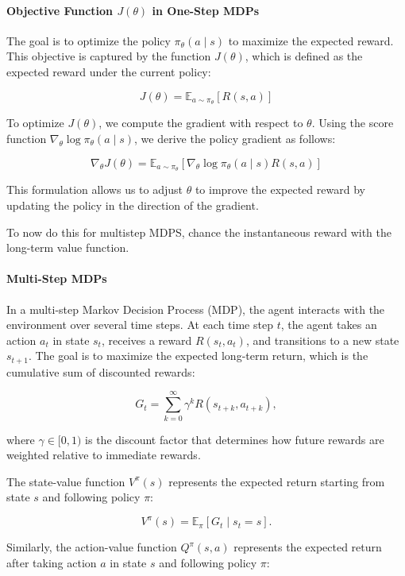 \documentclass[10pt, oneside]{article}
\theoremstyle{definition}
\begin{document}
\paragraph{Objective Function \( J(\theta) \) in One-Step MDPs}

The goal is to optimize the policy \( \pi_\theta(a \mid s) \) to maximize the expected reward. This objective is captured by the function \( J(\theta) \), which is defined as the expected reward under the current policy:

\[
J(\theta) = \mathbb{E}_{a \sim \pi_\theta} [R(s, a)]
\]

To optimize \( J(\theta) \), we compute the gradient with respect to \( \theta \). Using the score function \( \nabla_\theta \log \pi_\theta(a \mid s) \), we derive the policy gradient as follows:

\[
\nabla_\theta J(\theta) = \mathbb{E}_{a \sim \pi_\theta} \left[ \nabla_\theta \log \pi_\theta(a \mid s) R(s, a) \right]
\]

This formulation allows us to adjust \( \theta \) to improve the expected reward by updating the policy in the direction of the gradient.

To now do this for multistep MDPS, chance the instantaneous reward with the long-term value function. 

\paragraph{Multi-Step MDPs}

In a multi-step Markov Decision Process (MDP), the agent interacts with the environment over several time steps. At each time step \( t \), the agent takes an action \( a_t \) in state \( s_t \), receives a reward \( R(s_t, a_t) \), and transitions to a new state \( s_{t+1} \). The goal is to maximize the expected long-term return, which is the cumulative sum of discounted rewards:

\[
G_t = \sum_{k=0}^{\infty} \gamma^k R(s_{t+k}, a_{t+k}),
\]

where \( \gamma \in [0,1) \) is the discount factor that determines how future rewards are weighted relative to immediate rewards.

The state-value function \( V^\pi(s) \) represents the expected return starting from state \( s \) and following policy \( \pi \):

\[
V^\pi(s) = \mathbb{E}_\pi [ G_t \mid s_t = s ].
\]

Similarly, the action-value function \( Q^\pi(s, a) \) represents the expected return after taking action \( a \) in state \( s \) and following policy \( \pi \):
\end{document}
